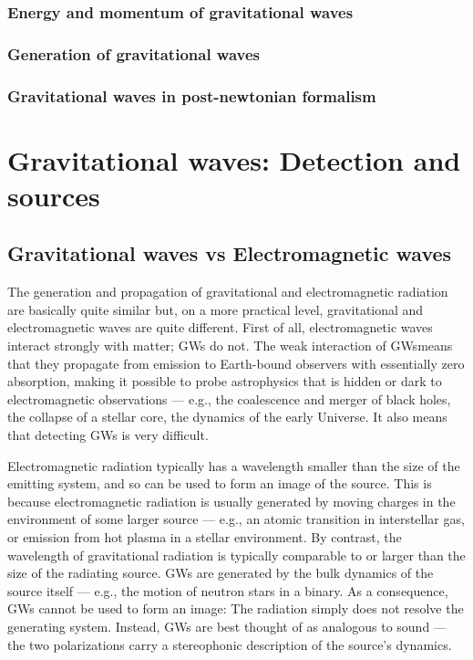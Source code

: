 \documentclass[binding=0.6cm, LaM]{sapthesis}
\begin{document}
\subsection{Energy and momentum of gravitational waves}


\subsection{Generation of gravitational waves}

\subsection{Gravitational waves in post-newtonian formalism}

\chapter{Gravitational waves: Detection and sources}
\section{Gravitational waves vs Electromagnetic waves}
The generation and propagation of gravitational and electromagnetic radiation are basically quite similar but, on a more practical level, gravitational and electromagnetic waves are quite different.
First of all, electromagnetic waves interact strongly with matter; GWs do not. 
The weak interaction of GWsmeans that they propagate from emission to Earth-bound observers with essentially zero absorption, making it possible to probe astrophysics that is hidden or dark to electromagnetic observations — e.g., the coalescence and merger of black holes, the collapse of a stellar core, the dynamics of the early Universe. It also means that detecting GWs is very difficult. 

Electromagnetic radiation typically has a wavelength smaller than the size of the emitting system, and so can be used to form an image of the source. This is because electromagnetic radiation is usually generated by moving charges in the environment of some larger source — e.g., an atomic transition in interstellar gas, or emission from hot plasma in a stellar environment. By contrast, the wavelength of gravitational radiation is typically comparable to or larger than the size of the radiating source. GWs are generated by the bulk dynamics of the source itself — e.g., the motion of neutron stars in a binary. As a consequence, GWs cannot be used to form an image: The radiation simply does not resolve the generating system. Instead, GWs are best thought of as analogous to sound — the two polarizations carry a stereophonic description of the source’s dynamics.
\end{document}
